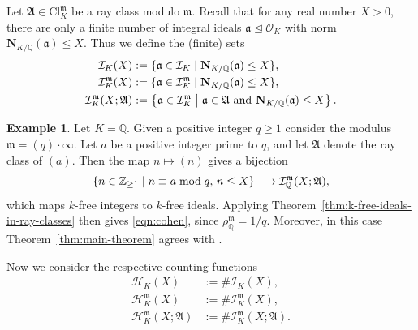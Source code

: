 \documentclass[11pt, reqno]{amsart}
\numberwithin{equation}{section}
\newcommand{\suchthat}{\;\ifnum\currentgrouptype=16 \middle\fi|\;}
\newcommand{\Z}{\mathbb{Z}}
\newcommand{\Q}{\mathbb{Q}}
\newcommand{\Nrm}[2]{\mathbf{N}_{#1}(#2)}
\theoremstyle{definition}
\newtheorem{example}[theorem]{Example}
\begin{document}
Let $\mathfrak{A} \in \mathrm{Cl}_K^{\mathfrak{m}}$ be a ray class modulo $\mathfrak{m}$.
Recall that for any real number $X > 0$, there are only a finite number of integral ideals $\mathfrak{a} \trianglelefteq \mathcal{O}_K$ with norm $\Nrm{K/\Q}{\mathfrak{a}} \leq X$. 
Thus we define the (finite) sets
\begin{align*}
\mathcal{I}_K(X) &:= \{ \mathfrak{a} \in \mathcal{I}_K \suchthat \Nrm{K/\Q}{\mathfrak{a}} \leq X \},\\
\mathcal{I}_K^{\mathfrak{m}}(X) &:= \{ \mathfrak{a} \in \mathcal{I}_K^{\mathfrak{m}} \suchthat \Nrm{K/\Q}{\mathfrak{a}} \leq X \},\\
\mathcal{I}_K^{\mathfrak{m}}(X; \mathfrak{A}) &:= \left\{ \mathfrak{a} \in \mathcal{I}_K^{\mathfrak{m}} \suchthat \text{$\mathfrak{a} \in \mathfrak{A}$ and $\Nrm{K/\Q}{\mathfrak{a}} \leq X$} \right\}.
\end{align*}

\begin{example}
    \label{ex:classQ}
    Let $K = \Q$.
    Given a positive integer $q \geq 1$ consider the modulus $\mathfrak{m} = (q) \cdot \infty$.
    Let $a$ be a positive integer prime to $q$, and let $\mathfrak{A}$ denote the ray class of $(a)$.
    Then the map $n \mapsto (n)$ gives a bijection
   \begin{equation}
        \label{eqn:arith_progression}
       \{n \in \Z_{\geq 1} \suchthat n \equiv a \bmod{q}, \, n \leq X \}
       \longrightarrow
       \mathcal{I}^\mathfrak{m}_\Q(X;\mathfrak{A}),
   \end{equation} 
   which maps $k$-free integers to $k$-free ideals.
   Applying Theorem~\ref{thm:k-free-ideals-in-ray-classes} then gives \eqref{eqn:cohen}, since $\rho_\Q^\mathfrak{m} = 1/q$.
   Moreover, in this case Theorem~\ref{thm:main-theorem} agrees with \cite[Theorem 1]{nymann1992distribution}.
\end{example}

Now we consider the respective counting functions
\begin{align*}
\mathcal{H}_K(X) &:= \# \mathcal{I}_K(X),\\
\mathcal{H}_K^{\mathfrak{m}}(X) &:= \# \mathcal{I}_K^{\mathfrak{m}}(X),\\
\mathcal{H}_K^{\mathfrak{m}}(X; \mathfrak{A}) &:= \# \mathcal{I}_K^{\mathfrak{m}}(X; \mathfrak{A}).
\end{align*}
\end{document}
